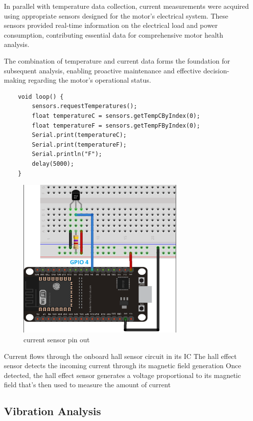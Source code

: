 In parallel with temperature data collection, current measurements were acquired using appropriate sensors designed for the motor's electrical system. These sensors provided real-time information on the electrical load and power consumption, contributing essential data for comprehensive motor health analysis.

The combination of temperature and current data forms the foundation for subsequent analysis, enabling proactive maintenance and effective decision-making regarding the motor's operational status.


\pagebreak 

\begin{lstlisting}
	void loop() {
		sensors.requestTemperatures(); 
		float temperatureC = sensors.getTempCByIndex(0);
		float temperatureF = sensors.getTempFByIndex(0);
		Serial.print(temperatureC);
		Serial.print(temperatureF);
		Serial.println("F");
		delay(5000);
	}
\end{lstlisting}



\begin{figure}[!h]
	\centering
	\includegraphics[width=0.7\linewidth, height = 8cm]{Figures/ds18b20}
	\caption{current sensor pin out}
	
\end{figure}
Current flows through the onboard hall sensor circuit in its IC
The hall effect sensor detects the incoming current through its magnetic field generation
Once detected, the hall effect sensor generates a voltage proportional to its magnetic field that’s then used to measure the amount of current 

\subsection{Vibration Analysis}

